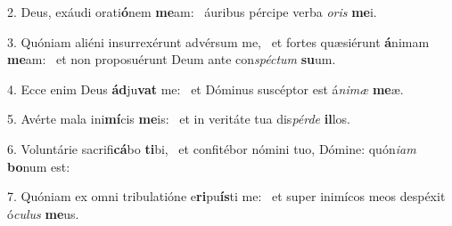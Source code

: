 2. Deus, exáudi orati\textbf{ó}nem \textbf{me}am: \ast\  áuribus pércipe verba \textit{o}\textit{ris} \textbf{me}i.\

3. Quóniam aliéni insurrexérunt advérsum me, \dag\  et fortes quæsiérunt \textbf{á}nimam \textbf{me}am: \ast\  et non proposuérunt Deum ante con\textit{spéc}\textit{tum} \textbf{su}um.\

4. Ecce enim Deus \textbf{ád}ju\textbf{vat} me: \ast\  et Dóminus suscéptor est á\textit{ni}\textit{mæ} \textbf{me}æ.\

5. Avérte mala ini\textbf{mí}cis \textbf{me}is: \ast\  et in veritáte tua dis\textit{pér}\textit{de} \textbf{il}los.\

6. Voluntárie sacrifi\textbf{cá}bo \textbf{ti}bi, \ast\  et confitébor nómini tuo, Dómine: quón\textit{i}\textit{am} \textbf{bo}num est:\

7. Quóniam ex omni tribulatióne e\textbf{ri}pu\textbf{ís}ti me: \ast\  et super inimícos meos despéxit ó\textit{cu}\textit{lus} \textbf{me}us.\

